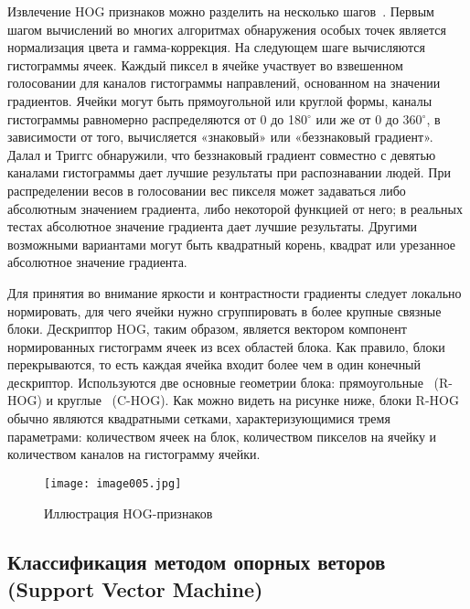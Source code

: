 Извлечение HOG признаков можно разделить на несколько шагов~\cite{seven}. Первым шагом вычислений во многих алгоритмах обнаружения особых точек является нормализация цвета и гамма-коррекция. На следующем шаге вычисляются гистограммы ячеек. Каждый пиксел в ячейке участвует во взвешенном голосовании для каналов гистограммы направлений, основанном на значении градиентов. Ячейки могут быть прямоугольной или круглой формы, каналы гистограммы равномерно распределяются от 0 до 180$^{\circ}$ или же от 0 до 360$^{\circ}$, в зависимости от того, вычисляется «знаковый» или «беззнаковый градиент». Далал и Триггс обнаружили, что беззнаковый градиент совместно с девятью каналами гистограммы дает лучшие результаты при распознавании людей. При распределении весов в голосовании вес пикселя может задаваться либо абсолютным значением градиента, либо некоторой функцией от него; в реальных тестах абсолютное значение градиента дает лучшие результаты. Другими возможными вариантами могут быть квадратный корень, квадрат или урезанное абсолютное значение градиента.

Для принятия во внимание яркости и контрастности градиенты следует локально нормировать, для чего ячейки нужно сгруппировать в более крупные связные блоки. Дескриптор HOG, таким образом, является вектором компонент нормированных гистограмм ячеек из всех областей блока. Как правило, блоки перекрываются, то есть каждая ячейка входит более чем в один конечный дескриптор. Используются две основные геометрии блока: прямоугольные ~(R-HOG) и круглые ~(C-HOG). Как можно видеть на рисунке ниже, блоки R-HOG обычно являются квадратными сетками, характеризующимися тремя параметрами: количеством ячеек на блок, количеством пикселов на ячейку и количеством каналов на гистограмму ячейки.

\begin{figure}[htbp]
\centering
\texttt{[image: image005.jpg]}
\caption{Иллюстрация HOG-признаков~\cite{eight}}%
\label{fig:how-to-do-research}
\end{figure}

\subsection{Классификация методом опорных веторов (Support Vector Machine)}


